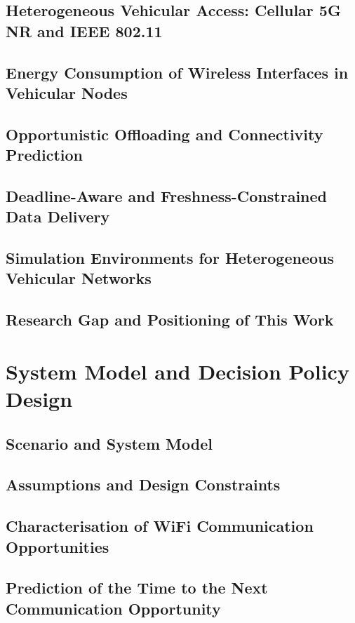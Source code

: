 \section{Heterogeneous Vehicular Access: Cellular 5G NR and IEEE 802.11}
\section{Energy Consumption of Wireless Interfaces in Vehicular Nodes}
\section{Opportunistic Offloading and Connectivity Prediction}
\section{Deadline-Aware and Freshness-Constrained Data Delivery}
\section{Simulation Environments for Heterogeneous Vehicular Networks}
\section{Research Gap and Positioning of This Work}


\chapter{System Model and Decision Policy Design}

\section{Scenario and System Model}
\section{Assumptions and Design Constraints}
\section{Characterisation of WiFi Communication Opportunities}
\section{Prediction of the Time to the Next Communication Opportunity}
